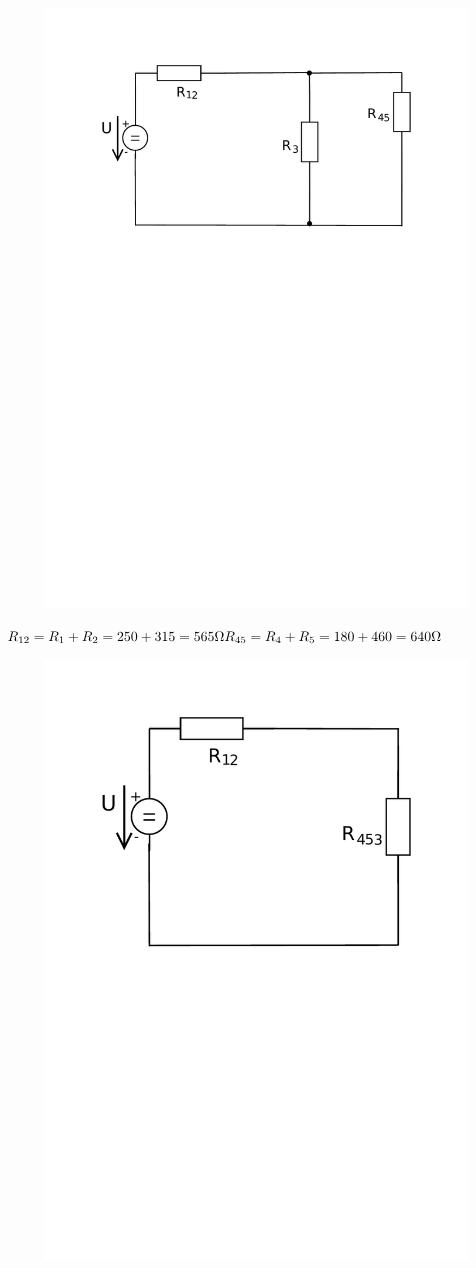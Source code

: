 \documentclass[12pt,a4paper]{article}         %
\begin{document}
    \begin{figure}[H] 
		\vspace{-0.6cm}
		\center\includegraphics[trim={0 17cm 0 0},clip,width=0.7\linewidth]{obr/2_3}
    \end{figure}
    
    {\Large
        \begin{math}\\
        R_{12} = R_1 + R_2 = 250 + 315 = 565 {\Omega}\\
        R_{45} = R_4 + R_5 = 180 + 460 = 640 {\Omega}\\
        \end{math}
    }
    
    \begin{figure}[H] 
		\vspace{-0.6cm}
		\center\includegraphics[trim={0 13cm 0 0},clip,width=0.5\linewidth]{obr/2_4}
    \end{figure}
    
\end{document}
